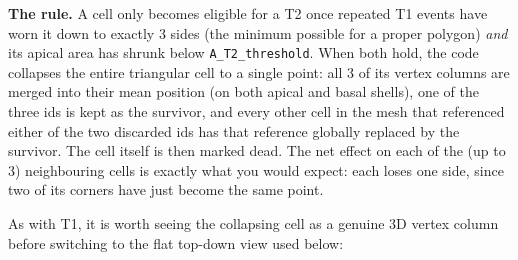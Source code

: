 \documentclass[11pt,a4paper]{report}
\begin{document}
\textbf{The rule.} A cell only becomes eligible for a T2 once repeated
T1 events have worn it down to exactly 3 sides (the minimum possible
for a proper polygon) \emph{and} its apical area has shrunk below
\texttt{A\_T2\_threshold}. When both hold, the code collapses the
entire triangular cell to a single point: all 3 of its vertex columns
are merged into their mean position (on both apical and basal shells),
one of the three ids is kept as the survivor, and every other cell in
the mesh that referenced either of the two discarded ids has that
reference globally replaced by the survivor. The cell itself is then
marked dead. The net effect on each of the (up to 3) neighbouring
cells is exactly what you would expect: each loses one side, since two
of its corners have just become the same point.

As with T1, it is worth seeing the collapsing cell as a genuine 3D
vertex column before switching to the flat top-down view used below:
\end{document}
